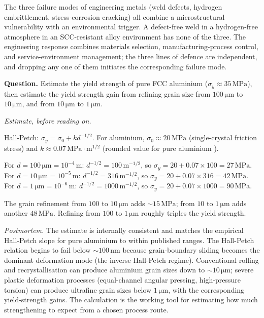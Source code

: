 \begin{principle}
The three failure modes of engineering metals (weld defects,
hydrogen embrittlement, stress-corrosion cracking) all combine a
microstructural vulnerability with an environmental trigger. A
defect-free weld in a hydrogen-free atmosphere in an SCC-resistant
alloy environment has none of the three. The engineering response
combines materials selection, manufacturing-process control, and
service-environment management; the three lines of defence are
independent, and dropping any one of them initiates the corresponding
failure mode.
\end{principle}

\begin{estimation}
\textbf{Question.} Estimate the yield strength of pure FCC aluminium
($\sigma_y \approx 35\,\text{MPa}$), then estimate the yield strength
gain from refining grain size from $100\,\si{\micro\meter}$ to
$10\,\si{\micro\meter}$, and from $10\,\si{\micro\meter}$ to $1\,
\si{\micro\meter}$.

\smallskip
\textit{Estimate, before reading on.}

\smallskip
Hall-Petch: $\sigma_y = \sigma_0 + k d^{-1/2}$. For aluminium, $\sigma_0
\approx 20\,\text{MPa}$ (single-crystal friction stress) and $k \approx
0.07\,\text{MPa}\cdot\text{m}^{1/2}$ (rounded value for pure aluminium
\cite[ch.~6]{text:dieter-mechanical-metallurgy}).

For $d = 100\,\si{\micro\meter} = 10^{-4}\,\text{m}$: $d^{-1/2} = 100\,
\text{m}^{-1/2}$, so $\sigma_y = 20 + 0.07 \times 100 = 27\,\text{MPa}$.
For $d = 10\,\si{\micro\meter} = 10^{-5}\,\text{m}$: $d^{-1/2} = 316\,
\text{m}^{-1/2}$, so $\sigma_y = 20 + 0.07 \times 316 = 42\,\text{MPa}$.
For $d = 1\,\si{\micro\meter} = 10^{-6}\,\text{m}$: $d^{-1/2} = 1000\,
\text{m}^{-1/2}$, so $\sigma_y = 20 + 0.07 \times 1000 = 90\,\text{MPa}$.

The grain refinement from $100$ to $10\,\si{\micro\meter}$ adds
$\sim 15\,\text{MPa}$; from $10$ to $1\,\si{\micro\meter}$ adds
another $48\,\text{MPa}$. Refining from $100$ to $1\,\si{\micro\meter}$
roughly triples the yield strength.

\smallskip
\textit{Postmortem.} The estimate is internally consistent and matches
the empirical Hall-Petch slope for pure aluminium to within published
ranges. The Hall-Petch relation begins to fail below $\sim 100\,\text{nm}$
because grain-boundary sliding becomes the dominant deformation mode
(the inverse Hall-Petch regime). Conventional rolling and recrystallisation
can produce aluminium grain sizes down to $\sim 10\,\si{\micro\meter}$;
severe plastic deformation processes (equal-channel angular pressing,
high-pressure torsion) can produce ultrafine grain sizes below $1\,
\si{\micro\meter}$, with the corresponding yield-strength gains. The
calculation is the working tool for estimating how much strengthening
to expect from a chosen process route.
\end{estimation}

